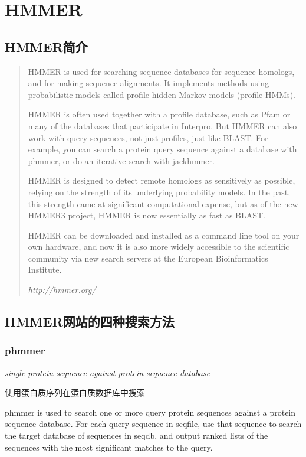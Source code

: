 \chapter{HMMER}

\section{HMMER简介}

\begin{quotation}
    HMMER is used for searching sequence databases for sequence homologs, and for making sequence alignments. It implements methods using probabilistic models called profile hidden Markov models (profile HMMs).

    HMMER is often used together with a profile database, such as Pfam or many of the databases that participate in Interpro. But HMMER can also work with query sequences, not just profiles, just like BLAST. For example, you can search a protein query sequence against a database with phmmer, or do an iterative search with jackhmmer.

    HMMER is designed to detect remote homologs as sensitively as possible, relying on the strength of its underlying probability models. In the past, this strength came at significant computational expense, but as of the new HMMER3 project, HMMER is now essentially as fast as BLAST.

    HMMER can be downloaded and installed as a command line tool on your own hardware, and now it is also more widely accessible to the scientific community via new search servers at the European Bioinformatics Institute.

    \textit{http://hmmer.org/}

\end{quotation}

\section{HMMER网站的四种搜索方法}

\subsection{phmmer}
\textit{single protein sequence against protein sequence database}

使用蛋白质序列在蛋白质数据库中搜索

phmmer is used to search one or more query protein sequences against a protein sequence database. For each query sequence in seqfile, use that sequence to search the target database of sequences in seqdb, and output ranked lists of the sequences with the most significant matches to the query.


